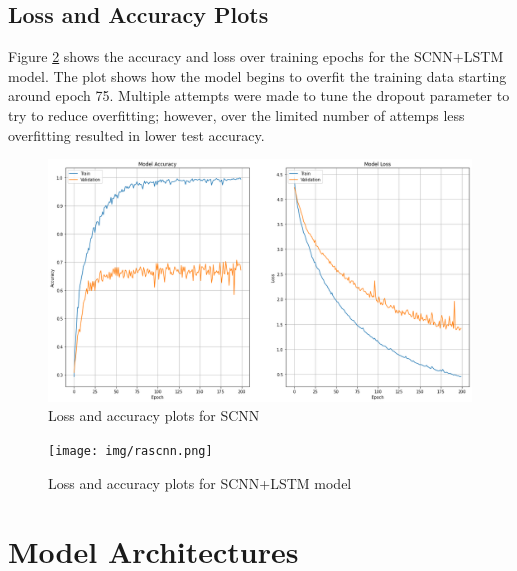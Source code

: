 \documentclass{article}
\begin{document}
\subsection{Loss and Accuracy Plots}
Figure \ref{fig:lstm} shows the accuracy and loss over training epochs for the
SCNN+LSTM model. The plot shows how the model begins to overfit the training
data starting around epoch 75. Multiple attempts were made to tune the dropout
parameter to try to reduce overfitting; however, over the limited number of
attemps less overfitting resulted in lower test accuracy.
\begin{figure}[H]
    \centering
    \includegraphics[scale=0.35]{img/scnn.png}
    \caption{Loss and accuracy plots for SCNN}
    \label{fig:lstm}
\end{figure}
\begin{figure}[H]
    \centering
    \texttt{[image: img/rascnn.png]}
    \caption{Loss and accuracy plots for SCNN+LSTM model}
    \label{fig:lstm}
\end{figure}

\pagebreak
\section{Model Architectures}
\end{document}

